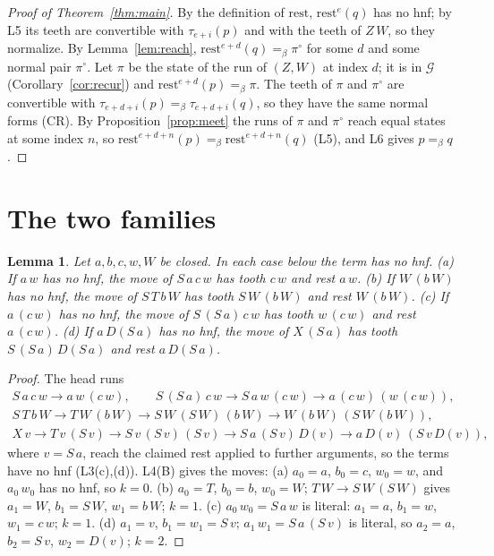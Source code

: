 \documentclass[11pt]{amsart}
\newtheorem{lemma}[theorem]{Lemma}
\theoremstyle{definition}
\newcommand{\conv}{=_\beta}
\newcommand{\rest}{\mathrm{rest}}
\newcommand{\Gc}{\mathcal G}
\begin{document}
\begin{proof}[Proof of Theorem~\ref{thm:main}]
By the definition of $\rest$, $\rest^e(q)$ has no hnf; by L5 its teeth are convertible with
$\tau_{e+i}(p)$ and with the teeth of $Z\,W$, so they normalize. By Lemma~\ref{lem:reach}, $\rest^{e+d}(q)\conv\pi^\circ$ for some $d$ and
some normal pair $\pi^\circ$. Let $\pi$ be the state of the run of $(Z,W)$ at index $d$; it is in $\Gc$
(Corollary~\ref{cor:recur}) and $\rest^{e+d}(p)\conv\pi$. The teeth of $\pi$ and $\pi^\circ$ are
convertible with $\tau_{e+d+i}(p)\conv\tau_{e+d+i}(q)$, so they have the same normal forms (CR). By
Proposition~\ref{prop:meet} the runs of $\pi$ and $\pi^\circ$ reach equal states at some index $n$, so
$\rest^{e+d+n}(p)\conv\rest^{e+d+n}(q)$ (L5), and L6 gives $p\conv q$.
\end{proof}

\section{The two families}\label{sec:families}

\begin{lemma}\label{lem:four}
Let $a,b,c,w,W$ be closed. In each case below the term has no hnf.
\textup{(a)} If $a\,w$ has no hnf, the move of $S\,a\,c\,w$ has tooth $c\,w$ and rest $a\,w$.
\textup{(b)} If $W\,(b\,W)$ has no hnf, the move of $S\,T\,b\,W$ has tooth $S\,W\,(b\,W)$ and rest
$W\,(b\,W)$.
\textup{(c)} If $a\,(c\,w)$ has no hnf, the move of $S\,(S\,a)\,c\,w$ has tooth $w\,(c\,w)$ and rest
$a\,(c\,w)$.
\textup{(d)} If $a\,D(S\,a)$ has no hnf, the move of $X\,(S\,a)$ has tooth $S\,(S\,a)\,D(S\,a)$ and rest
$a\,D(S\,a)$.
\end{lemma}

\begin{proof}
The head runs
\begin{gather*}
S\,a\,c\,w\to a\,w\,(c\,w),\qquad
S\,(S\,a)\,c\,w\to S\,a\,w\,(c\,w)\to a\,(c\,w)\,(w\,(c\,w)),\\
S\,T\,b\,W\to T\,W\,(b\,W)\to S\,W\,(S\,W)\,(b\,W)\to W\,(b\,W)\,(S\,W\,(b\,W)),\\
X\,v\to T\,v\,(S\,v)\to S\,v\,(S\,v)\,(S\,v)\to S\,a\,(S\,v)\,D(v)\to a\,D(v)\,(S\,v\,D(v)),
\end{gather*}
where $v=S\,a$, reach the claimed rest applied to further arguments, so the terms have no hnf
(L3(c),(d)). L4(B) gives the
moves: (a) $a_0=a$, $b_0=c$, $w_0=w$, and $a_0\,w_0$ has no hnf, so $k=0$. (b) $a_0=T$, $b_0=b$,
$w_0=W$; $T\,W\to S\,W\,(S\,W)$ gives $a_1=W$, $b_1=S\,W$, $w_1=b\,W$; $k=1$. (c) $a_0\,w_0=S\,a\,w$
is literal: $a_1=a$, $b_1=w$, $w_1=c\,w$; $k=1$. (d) $a_1=v$, $b_1=w_1=S\,v$; $a_1\,w_1=S\,a\,(S\,v)$
is literal, so $a_2=a$, $b_2=S\,v$, $w_2=D(v)$; $k=2$.
\end{proof}
\end{document}
